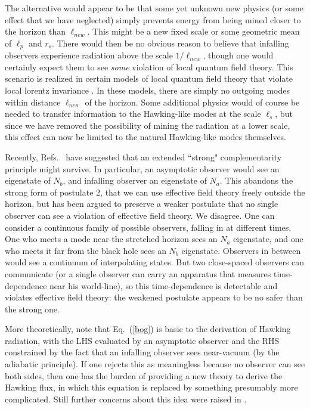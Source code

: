 \documentclass[12pt]{article}
\begin{document}
The alternative would appear to be that some yet unknown new physics (or some effect that we have neglected) simply prevents energy from being mined closer to the horizon than $\ell_{new}$. This might be a new fixed scale or some geometric mean of $\ell_p$ and $r_s$. There would then be no obvious reason to believe that infalling observers experience radiation above the scale $1/\ell_{new}$, though one would certainly expect them to see {\it some} violation of local quantum field theory.  This scenario is realized in certain models of local quantum field theory that violate local lorentz invariance \cite{breakL}.  In these models, there are simply no outgoing modes within distance $\ell_{new}$ of the horizon.  Some additional physics would of course be needed to transfer information to the Hawking-like modes at the scale $\ell_s$, but since we have removed the possibility of mining the radiation at a lower scale,  this effect can now be limited to the natural Hawking-like modes themselves.

Recently, Refs.~\cite{Banks,Srednicki,Bousso:2012as,Harlow:2012me} have suggested that an extended {``strong"} complementarity principle might survive.  In particular, an asymptotic observer would see an eigenstate of $N_b$, and infalling observer an eigenstate of $N_a$.  This abandons the strong form of postulate 2, that we can use effective field theory freely outside the horizon, but has been argued to preserve a weaker postulate that no single observer can see a violation of effective field theory.  We disagree.  One can consider a continuous family of possible observers, falling in at different times.  One who meets a mode near the stretched horizon sees an $N_a$ eigenstate, and one who meets it far from the black hole sees an $N_b$ eigenstate.  Observers in between would see a continuum of interpolating states.  But two close-spaced observers can communicate (or a single observer can carry an apparatus that measures time-dependence near his world-line), so this time-dependence is detectable and violates effective field theory: the weakened postulate {appears to be} no safer than the strong one.


More theoretically, note that Eq.~(\ref{bog}) is basic to the derivation of Hawking radiation, with the LHS evaluated {by an asymptotic observer and the RHS constrained by the fact that an infalling observer sees near-vacuum (by the adiabatic principle).} If one rejects this as meaningless because no observer can see both sides, then one has the burden of providing a new theory to derive the Hawking flux, in which this equation is replaced by something presumably more complicated.  {Still further concerns about this idea were raised in \cite{Chowdhury:2012tr}.}
\end{document}
